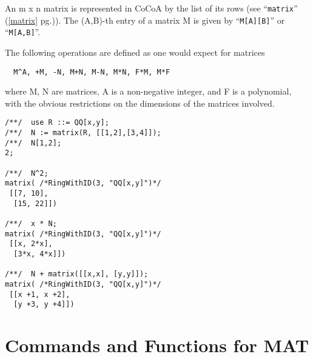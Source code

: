 \documentclass[a4paper]{mybook}
\begin{document}
        
An m x n matrix is represented in CoCoA by the list of its rows
(see ``\verb&matrix&'' (\ref{matrix} pg.\pageref{matrix})).
The (A,B)-th entry of a matrix M is given by ``\verb&M[A][B]&'' or ``\verb&M[A,B]&''.
\par 
The following operations are defined as one would expect for matrices
\begin{verbatim}
  M^A, +M, -N, M+N, M-N, M*N, F*M, M*F
\end{verbatim}
where M, N are matrices, A is a non-negative integer, and F is a
polynomial, with the obvious restrictions on the dimensions of the
matrices involved.
\begin{Verbatim}[label=example, rulecolor=\color{PineGreen}, frame=single]
/**/  use R ::= QQ[x,y];
/**/  N := matrix(R, [[1,2],[3,4]]);
/**/  N[1,2];
2;

/**/  N^2;
matrix( /*RingWithID(3, "QQ[x,y]")*/
 [[7, 10],
  [15, 22]])

/**/  x * N;
matrix( /*RingWithID(3, "QQ[x,y]")*/
 [[x, 2*x],
  [3*x, 4*x]])

/**/  N + matrix([[x,x], [y,y]]);
matrix( /*RingWithID(3, "QQ[x,y]")*/
 [[x +1, x +2],
  [y +3, y +4]])
\end{Verbatim}



\section{Commands and Functions for MAT}
\label{Commands and Functions for MAT}

        
\end{document}
